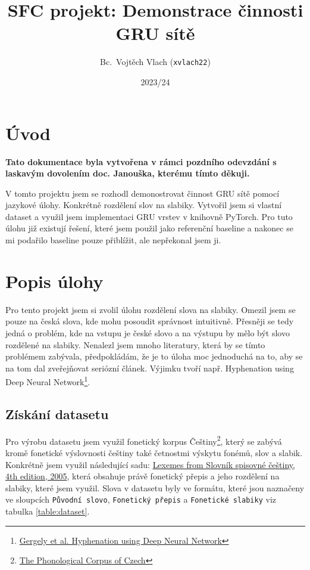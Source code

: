 \documentclass[a4paper]{article}
\title{SFC projekt: Demonstrace činnosti GRU sítě}
\author{Bc.\ Vojtěch Vlach (\texttt{xvlach22})}
\date{2023/24}
\theoremstyle{definition}
\begin{document}
\maketitle

\section{Úvod}
\textbf{Tato dokumentace byla vytvořena v rámci pozdního odevzdání s laskavým dovolením doc. Janouška, kterému tímto děkuji.}

V tomto projektu jsem se rozhodl demonostrovat činnost GRU sítě pomocí jazykové úlohy. Konkrétně rozdělení slov na slabiky. Vytvořil jsem si vlastní dataset a využil jsem implementaci GRU vrstev v  knihovně PyTorch. Pro tuto úlohu již existují řešení, které jsem použil jako referenční baseline a nakonec se mi podařilo baseline pouze přiblížit, ale nepřekonal jsem ji.

\section{Popis úlohy}

Pro tento projekt jsem si zvolil úlohu rozdělení slova na slabiky. Omezil jsem se pouze na česká slova, kde mohu posoudit správnost intuitivně. Přesněji se tedy jedná o problém, kde na vstupu je české slovo a na výstupu by mělo být slovo rozdělené na slabiky. Nenalezl jsem mnoho literatury, která by se tímto problémem zabývala, předpokládám, že je to úloha moc jednoduchá na to, aby se na tom dal zveřejňovat seriózní článek. Výjimku tvoří např. Hyphenation using Deep Neural Network\footnote{\href{https://negedng.github.io/files/2018-Hyphenation.pdf}{Gergely et al. Hyphenation using Deep Neural Network}}.

\subsection{Získání datasetu}

Pro výrobu datasetu jsem využil fonetický korpus Češtiny\footnote{\href{https://ujc.avcr.cz/phword}{The Phonological Corpus of Czech}}, který se zabývá kromě fonetické výslovnosti češtiny také četnostmi výskytu fonémů, slov a slabik. Konkrétně jsem využil následující sadu: \href{http://www.ujc.cas.cz/phword/ssc_29-06-16.zip}{Lexemes from Slovník spisovné češtiny, 4th edition, 2005}, která obsahuje právě fonetický přepis a jeho rozdělení na slabiky, které jsem využil. Slova v datasetu byly ve formátu, které jsou naznačeny ve sloupcích \texttt{Původní slovo}, \texttt{Fonetický přepis} a \texttt{Fonetické slabiky} viz tabulka \ref{table:dataset}.
\end{document}
